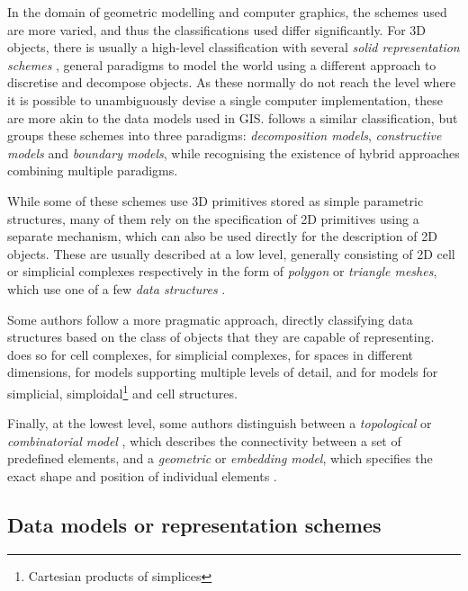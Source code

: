 In the domain of geometric modelling and computer graphics, the schemes used are more varied, and thus the classifications used differ significantly.
For 3D objects, there is usually a high-level classification with several \emph{solid representation schemes} \citep{Requicha80,Hoffmann92,Foley95}, general paradigms to model the world using a different approach to discretise and decompose objects.
As these normally do not reach the level where it is possible to unambiguously devise a single computer implementation, these are more akin to the data models used in GIS.\@
\citet{Mantyla88} follows a similar classification, but groups these schemes into three paradigms: \emph{decomposition models}, \emph{constructive models} and \emph{boundary models}, while recognising the existence of hybrid approaches combining multiple paradigms.

While some of these schemes use 3D primitives stored as simple parametric structures, many of them rely on the specification of 2D primitives using a separate mechanism, which can also be used directly for the description of 2D objects.
These are usually described at a low level, generally consisting of 2D cell or simplicial complexes respectively in the form of \emph{polygon} or \emph{triangle meshes}, which use one of a few \emph{data structures} \citep{Joy03,Alumbaugh05,Blandford05,deFloriani05}.

Some authors follow a more pragmatic approach, directly classifying data structures based on the class of objects that they are capable of representing.
\citet{Comic12} does so for cell complexes, \citet{deFloriani05} for simplicial complexes, \citet{Lienhardt91} for spaces in different dimensions, \citet{deFloriani05a} for models supporting multiple levels of detail, and \citet{Lienhardt09} for models for simplicial, simploidal\footnote{Cartesian products of simplices} and cell structures.

Finally, at the lowest level, some authors distinguish between a \emph{topological} or \emph{combinatorial model} \citep{Lienhardt91}, which describes the connectivity between a set of predefined elements, and a \emph{geometric} or \emph{embedding model}, which specifies the exact shape and position of individual elements \citep{Mantyla88}.

\subsection{Data models or representation schemes}
\label{ss:data-models}

